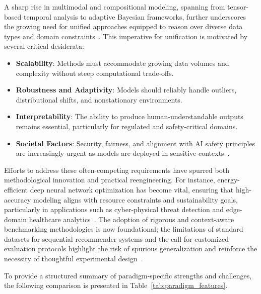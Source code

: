 \documentclass[11pt]{article}
\begin{document}
A sharp rise in multimodal and compositional modeling, spanning from tensor-based temporal analysis to adaptive Bayesian frameworks, further underscores the growing need for unified approaches equipped to reason over diverse data types and domain constraints~\cite{ref46,ref51,ref69,ref70}. This imperative for unification is motivated by several critical desiderata:

\begin{itemize}
    \item \textbf{Scalability}: Methods must accommodate growing data volumes and complexity without steep computational trade-offs.
    \item \textbf{Robustness and Adaptivity}: Models should reliably handle outliers, distributional shifts, and nonstationary environments.
    \item \textbf{Interpretability}: The ability to produce human-understandable outputs remains essential, particularly for regulated and safety-critical domains.
    \item \textbf{Societal Factors}: Security, fairness, and alignment with AI safety principles are increasingly urgent as models are deployed in sensitive contexts~\cite{ref79,ref85}.
\end{itemize}

Efforts to address these often-competing requirements have spurred both methodological innovation and practical reengineering. For instance, energy-efficient deep neural network optimization has become vital, ensuring that high-accuracy modeling aligns with resource constraints and sustainability goals, particularly in applications such as cyber-physical threat detection and edge-domain healthcare analytics~\cite{ref61}. The adoption of rigorous and context-aware benchmarking methodologies is now foundational; the limitations of standard datasets for sequential recommender systems and the call for customized evaluation protocols highlight the risk of spurious generalization and reinforce the necessity of thoughtful experimental design~\cite{ref73,ref87}.

To provide a structured summary of paradigm-specific strengths and challenges, the following comparison is presented in Table~\ref{tab:paradigm_features}.
\end{document}
